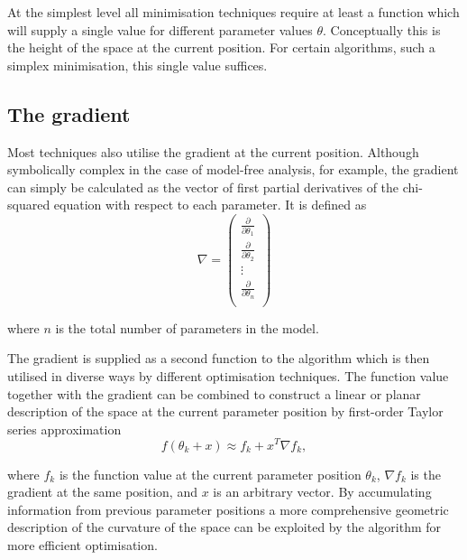 At the simplest level all minimisation techniques require at least a function which will supply a single value for different parameter values $\theta$.
Conceptually this is the height of the space at the current position.
For certain algorithms, such a simplex minimisation, this single value suffices.




\subsection{The gradient}
\label{sect: gradient}

Most techniques also utilise the gradient at the current position.
Although symbolically complex in the case of model-free analysis, for example, the gradient can simply be calculated as the vector of first partial derivatives of the chi-squared equation with respect to each parameter.
It is defined as
\begin{equation}
 \nabla = \begin{pmatrix}
  \frac{\partial}{\partial \theta_1} \\
  \frac{\partial}{\partial \theta_2} \\
  \vdots \\
  \frac{\partial}{\partial \theta_n} \\
 \end{pmatrix}
\end{equation}

\noindent where $n$ is the total number of parameters in the model.

The gradient is supplied as a second function to the algorithm which is then utilised in diverse ways by different optimisation techniques.
The function value together with the gradient can be combined to construct a linear or planar description of the space at the current parameter position by first-order Taylor series approximation
\begin{equation} \label{eq: linear model}
 f(\theta_k + x) \approx f_k  +  x^T \nabla f_k,
\end{equation}

\noindent where $f_k$ is the function value at the current parameter position $\theta_k$, $\nabla f_k$ is the gradient at the same position, and $x$ is an arbitrary vector.
By accumulating information from previous parameter positions a more comprehensive geometric description of the curvature of the space can be exploited by the algorithm for more efficient optimisation.

